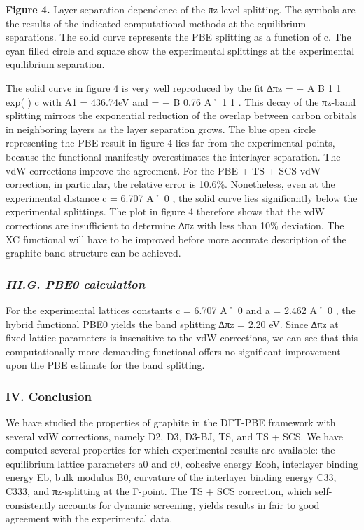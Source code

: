 \documentclass{article}
\begin{document}
\textbf{Figure 4.} Layer-separation dependence of the πz-level splitting. The symbols are the results of the indicated computational methods at the equilibrium separations. The solid curve represents the PBE splitting as a function of c. The cyan filled circle and square show the experimental splittings at the experimental equilibrium separation.

The solid curve in figure 4 is very well reproduced by the fit ∆πz = − A B 1 1 exp( ) c with A1 = 436.74eV and = − B 0.76 A˚ 1 1 . This decay of the πz-band splitting mirrors the exponential reduction of the overlap between carbon orbitals in neighboring layers as the layer separation grows. The blue open circle representing the PBE result in figure 4 lies far from the experimental points, because the functional manifestly overestimates the interlayer separation. The vdW corrections improve the agreement. For the PBE + TS + SCS vdW correction, in particular, the relative error is 10.6\%. Nonetheless, even at the experimental distance c = 6.707 A˚ 0 , the solid curve lies significantly below the experimental splittings. The plot in figure 4 therefore shows that the vdW corrections are insufficient to determine ∆πz with less than 10\% deviation. The XC functional will have to be improved before more accurate description of the graphite band structure can be achieved.

\subsubsection{\textit{III.G. PBE0 calculation}}

For the experimental lattices constants c = 6.707 A˚ 0 and a = 2.462 A˚ 0 , the hybrid functional PBE0 yields the band splitting ∆πz = 2.20 eV. Since ∆πz at fixed lattice parameters is insensitive to the vdW corrections, we can see that this computationally more demanding functional offers no significant improvement upon the PBE estimate for the band splitting.

\subsubsection{IV. \textbf{Conclusion}}

We have studied the properties of graphite in the DFT-PBE framework with several vdW corrections, namely D2, D3, D3-BJ, TS, and TS + SCS. We have computed several properties for which experimental results are available: the equilibrium lattice parameters a0 and c0, cohesive energy Ecoh, interlayer binding energy Eb, bulk modulus B0, curvature of the interlayer binding energy C33, C333, and πz-splitting at the Γ-point. The TS + SCS correction, which self-consistently accounts for dynamic screening, yields results in fair to good agreement with the experimental data.
\end{document}
